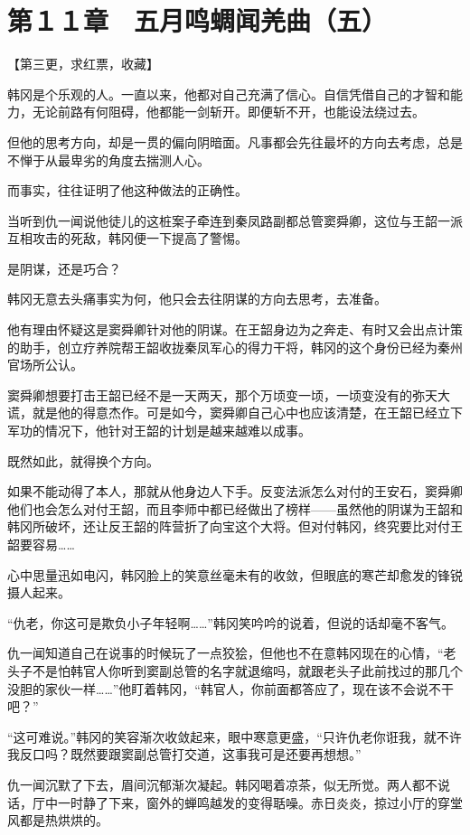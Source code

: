 \section{第１１章　五月鸣蜩闻羌曲（五）}

【第三更，求红票，收藏】

韩冈是个乐观的人。一直以来，他都对自己充满了信心。自信凭借自己的才智和能力，无论前路有何阻碍，他都能一剑斩开。即便斩不开，也能设法绕过去。

但他的思考方向，却是一贯的偏向阴暗面。凡事都会先往最坏的方向去考虑，总是不惮于从最卑劣的角度去揣测人心。

而事实，往往证明了他这种做法的正确性。

当听到仇一闻说他徒儿的这桩案子牵连到秦凤路副都总管窦舜卿，这位与王韶一派互相攻击的死敌，韩冈便一下提高了警惕。

是阴谋，还是巧合？

韩冈无意去头痛事实为何，他只会去往阴谋的方向去思考，去准备。

他有理由怀疑这是窦舜卿针对他的阴谋。在王韶身边为之奔走、有时又会出点计策的助手，创立疗养院帮王韶收拢秦凤军心的得力干将，韩冈的这个身份已经为秦州官场所公认。

窦舜卿想要打击王韶已经不是一天两天，那个万顷变一顷，一顷变没有的弥天大谎，就是他的得意杰作。可是如今，窦舜卿自己心中也应该清楚，在王韶已经立下军功的情况下，他针对王韶的计划是越来越难以成事。

既然如此，就得换个方向。

如果不能动得了本人，那就从他身边人下手。反变法派怎么对付的王安石，窦舜卿他们也会怎么对付王韶，而且李师中都已经做出了榜样——虽然他的阴谋为王韶和韩冈所破坏，还让反王韶的阵营折了向宝这个大将。但对付韩冈，终究要比对付王韶要容易……

心中思量迅如电闪，韩冈脸上的笑意丝毫未有的收敛，但眼底的寒芒却愈发的锋锐摄人起来。

“仇老，你这可是欺负小子年轻啊……”韩冈笑吟吟的说着，但说的话却毫不客气。

仇一闻知道自己在说事的时候玩了一点狡狯，但他也不在意韩冈现在的心情，“老头子不是怕韩官人你听到窦副总管的名字就退缩吗，就跟老头子此前找过的那几个没胆的家伙一样……”他盯着韩冈，“韩官人，你前面都答应了，现在该不会说不干吧？”

“这可难说。”韩冈的笑容渐次收敛起来，眼中寒意更盛，“只许仇老你诳我，就不许我反口吗？既然要跟窦副总管打交道，这事我可是还要再想想。”

仇一闻沉默了下去，眉间沉郁渐次凝起。韩冈喝着凉茶，似无所觉。两人都不说话，厅中一时静了下来，窗外的蝉鸣越发的变得聒噪。赤日炎炎，掠过小厅的穿堂风都是热烘烘的。

